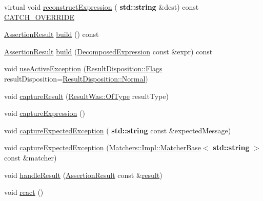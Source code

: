 \begin{DoxyCompactItemize}
\item 
virtual void \hyperlink{class_catch_1_1_result_builder_a7d94b15cf04301a8617e7b16158b5d82}{reconstruct\+Expression} (\textbf{ std\+::string} \&dest) const \hyperlink{catch_8hpp_a8ecdce4d3f57835f707915ae831eb847}{C\+A\+T\+C\+H\+\_\+\+O\+V\+E\+R\+R\+I\+DE}
\item 
\hyperlink{class_catch_1_1_assertion_result}{Assertion\+Result} \hyperlink{class_catch_1_1_result_builder_a4fc96e7bb8b5f7119a8e79692ec97808}{build} () const
\item 
\hyperlink{class_catch_1_1_assertion_result}{Assertion\+Result} \hyperlink{class_catch_1_1_result_builder_a475d19a04c5d10a5a87cbb85447b59da}{build} (\hyperlink{struct_catch_1_1_decomposed_expression}{Decomposed\+Expression} const \&expr) const
\item 
void \hyperlink{class_catch_1_1_result_builder_a5bbd2f14a678f3e8d0f791ac6d233d65}{use\+Active\+Exception} (\hyperlink{struct_catch_1_1_result_disposition_a3396cad6e2259af326b3aae93e23e9d8}{Result\+Disposition\+::\+Flags} result\+Disposition=\hyperlink{struct_catch_1_1_result_disposition_a3396cad6e2259af326b3aae93e23e9d8af3bd52347ed6f8796e8ce2f77bb39ea5}{Result\+Disposition\+::\+Normal})
\item 
void \hyperlink{class_catch_1_1_result_builder_a10e467f7b7a4976e5d148b4d5066e8fd}{capture\+Result} (\hyperlink{struct_catch_1_1_result_was_a624e1ee3661fcf6094ceef1f654601ef}{Result\+Was\+::\+Of\+Type} result\+Type)
\item 
void \hyperlink{class_catch_1_1_result_builder_af2ae2343965802eeeb0abbd4ea9d2d36}{capture\+Expression} ()
\item 
void \hyperlink{class_catch_1_1_result_builder_a9ac96f6220c8dd8e4feee725c6228d77}{capture\+Expected\+Exception} (\textbf{ std\+::string} const \&expected\+Message)
\item 
void \hyperlink{class_catch_1_1_result_builder_a2d6a194258f07f212fef098c0201038a}{capture\+Expected\+Exception} (\hyperlink{struct_catch_1_1_matchers_1_1_impl_1_1_matcher_base}{Matchers\+::\+Impl\+::\+Matcher\+Base}$<$ \textbf{ std\+::string} $>$ const \&matcher)
\item 
void \hyperlink{class_catch_1_1_result_builder_ad8bb17e4ac590b75bf8630d8f3502f4e}{handle\+Result} (\hyperlink{class_catch_1_1_assertion_result}{Assertion\+Result} const \&\hyperlink{util_8cpp_ade6d6d18a46c8aa95eed5e179d003e45}{result})
\item 
void \hyperlink{class_catch_1_1_result_builder_a3085cdc46533d45bed6f652a2ac295c0}{react} ()
\item 

\end{DoxyCompactItemize}
